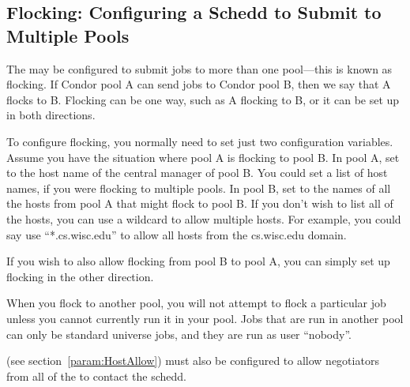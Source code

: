 \subsection{\label{sec:Flocking}
Flocking: Configuring a Schedd to Submit to Multiple Pools}

The  may be configured to submit jobs to more than one
pool---this is known as flocking. If Condor pool A can send jobs to
Condor pool B, then we say that A flocks to B. Flocking can be one
way, such as A flocking to B, or it can be set up in both directions. 

To configure flocking, you normally need to set just two configuration
variables. Assume you have the situation where pool A is flocking to
pool B. In pool A, set  to the host name of the
central manager of pool B. You could set a list of host names, if you
were flocking to multiple pools. In pool B, set 
to the names of all the hosts from pool A that might flock to pool
B. If you don't wish to list all of the hosts, you can use a wildcard
to allow multiple hosts. For example, you could say use
``*.cs.wisc.edu'' to allow all hosts from the cs.wisc.edu domain. 

If you wish to also allow flocking from pool B to pool A, you can
simply set up flocking in the other direction.

When you flock to another pool, you will not attempt to flock a
particular job unless you cannot currently run it in your pool. Jobs
that are run in another pool can only be standard universe jobs, and
they are run as user ``nobody''.

 (see
section~\ref{param:HostAllow}) must also be configured to allow
negotiators from all of the  to
contact the schedd.  



